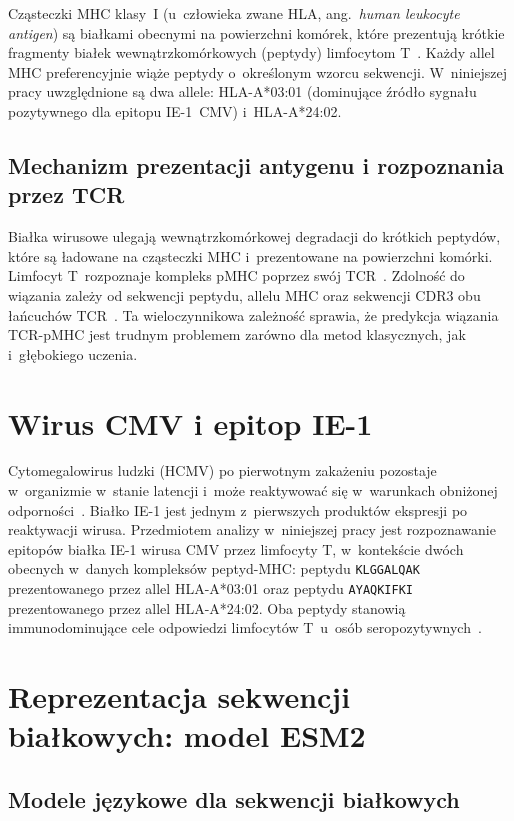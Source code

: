 \documentclass{SGGW-thesis}
\begin{document}
Cząsteczki MHC klasy~I (u~człowieka zwane HLA, ang.\ \textit{human leukocyte antigen})
są białkami obecnymi na powierzchni komórek, które prezentują krótkie fragmenty białek
wewnątrzkomórkowych (peptydy) limfocytom T~\cite{janeway2017}. Każdy allel MHC
preferencyjnie wiąże peptydy o~określonym wzorcu sekwencji. W~niniejszej pracy uwzględnione
są dwa allele: HLA-A*03:01 (dominujące źródło sygnału pozytywnego dla epitopu IE-1~CMV)
i~HLA-A*24:02.

\subsection{Mechanizm prezentacji antygenu i rozpoznania przez TCR}

Białka wirusowe ulegają wewnątrzkomórkowej degradacji do krótkich peptydów, które są ładowane
na cząsteczki MHC i~prezentowane na powierzchni komórki. Limfocyt T~rozpoznaje kompleks pMHC
poprzez swój TCR~\cite{wills1996}. Zdolność do wiązania zależy od sekwencji peptydu, allelu MHC
oraz sekwencji CDR3 obu łańcuchów TCR~\cite{janeway2017}. Ta wieloczynnikowa zależność
sprawia, że predykcja wiązania TCR-pMHC jest trudnym problemem zarówno dla metod klasycznych,
jak i~głębokiego uczenia.

\section{Wirus CMV i epitop IE-1}

Cytomegalowirus ludzki (HCMV) po pierwotnym zakażeniu pozostaje w~organizmie w~stanie latencji
i~może reaktywować się w~warunkach obniżonej odporności~\cite{sylwester2005}.
Białko IE-1 jest jednym z~pierwszych produktów ekspresji po reaktywacji wirusa.
Przedmiotem analizy w~niniejszej pracy jest rozpoznawanie epitopów białka IE-1 wirusa CMV przez
limfocyty T, w~kontekście dwóch obecnych w~danych kompleksów peptyd-MHC: peptydu \texttt{KLGGALQAK}
prezentowanego przez allel HLA-A*03:01 oraz peptydu \texttt{AYAQKIFKI} prezentowanego przez allel
HLA-A*24:02. Oba peptydy stanowią immunodominujące cele odpowiedzi limfocytów T~u~osób
seropozytywnych~\cite{wills1996,sylwester2005}.

\section{Reprezentacja sekwencji białkowych: model ESM2}

\subsection{Modele językowe dla sekwencji białkowych}
\end{document}

